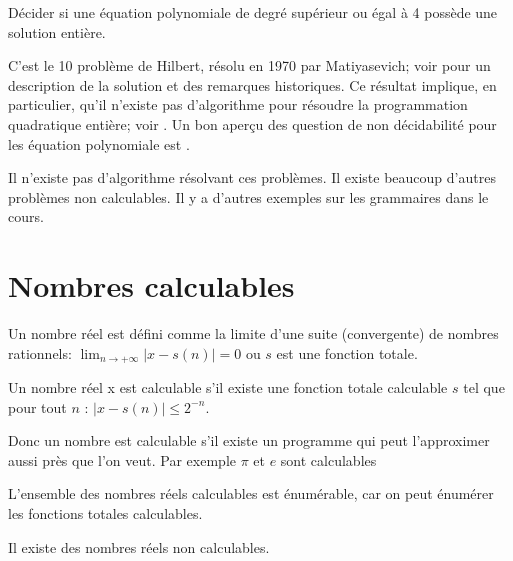\begin{mydef}
  Décider si une équation
  polynomiale de degré supérieur ou égal à 4 possède une solution entière.
\end{mydef}
C'est le 10\ieme{} problème de Hilbert, résolu en 1970 par Matiyasevich;
voir \cite{davis1973hilbert} pour un description de la solution et des remarques historiques.
Ce résultat implique, en particulier, qu'il n'existe pas d'algorithme pour résoudre
la programmation quadratique entière; voir \cite{jeroslow1973there}.
Un bon aperçu des question de non décidabilité pour les équation polynomiale est \cite{koenigsmann2014undecidability}.

Il n'existe pas d'algorithme résolvant ces problèmes. Il existe beaucoup
d'autres problèmes non calculables. Il y a d'autres exemples sur les grammaires dans le cours.

\section{Nombres calculables}
\label{sec:nombres_calculables}

\begin{mydef}
	Un nombre réel est défini comme la limite d'une suite (convergente) de
	nombres rationnels: $\lim_{n \rightarrow +\infty} |x-s(n)| = 0 $ ou $s$ est
	une fonction totale.
\end{mydef}

\begin{mydef}
	Un nombre réel x est calculable s’il existe une fonction totale
	calculable $s$ tel que pour tout $n$  : $|x-s(n)| \leq 2^{-n}$.
\end{mydef}

\begin{myrem}
	Donc un nombre est calculable s'il existe un programme qui peut
	l'approximer aussi près que l'on veut. Par exemple $\pi$ et $e$ sont
	calculables
\end{myrem}

\begin{myprop}
	L'ensemble des nombres réels calculables est énumérable, car on peut énumérer les
	fonctions totales calculables.
\end{myprop}

\begin{myprop}
	Il existe des nombres réels non calculables.
\end{myprop}

